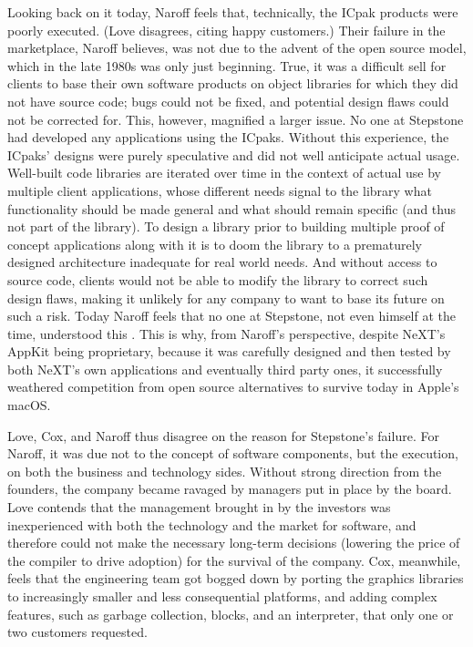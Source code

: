 \documentclass[acmsmall]{acmart}\settopmatter{}
\begin{document}
Looking back on it today, Naroff feels that, technically, the ICpak products were poorly executed. (Love disagrees, citing happy customers.) Their failure in the marketplace, Naroff believes, was not due to the advent of the open source model, which in the late 1980s was only just beginning. True, it was a difficult sell for clients to base their own software products on object libraries for which they did not have source code; bugs could not be fixed, and potential design flaws could not be corrected for. This, however, magnified a larger issue. No one at Stepstone had developed any applications using the ICpaks. Without this experience, the ICpaks' designs were purely speculative and did not well anticipate actual usage. Well-built code libraries are iterated over time in the context of actual use by multiple client applications, whose different needs signal to the library what functionality should be made general and what should remain specific (and thus not part of the library). To design a library prior to building multiple proof of concept applications along with it is to doom the library to a prematurely designed architecture inadequate for real world needs. And without access to source code, clients would not be able to modify the library to correct such design flaws, making it unlikely for any company to want to base its future on such a risk. Today Naroff feels that no one at Stepstone, not even himself at the time, understood this \citep[24--25]{naroff_oral_2018}. This is why, from Naroff's perspective, despite NeXT's AppKit being proprietary, because it was carefully designed and then tested by both NeXT's own applications and eventually third party ones, it successfully weathered competition from open source alternatives to survive today in Apple's macOS. 

Love, Cox, and Naroff thus disagree on the reason for Stepstone's failure. For Naroff, it was due not to the concept of software components, but the execution, on both the business and technology sides. Without strong direction from the founders, the company became ravaged by managers put in place by the board. Love contends that the management brought in by the investors was inexperienced with both the technology and the market for software, and therefore could not make the necessary long-term decisions (lowering the price of the compiler to drive adoption) for the survival of the company. Cox, meanwhile, feels that the engineering team got bogged down by porting the graphics libraries to increasingly smaller and less consequential platforms, and adding complex features, such as garbage collection, blocks, and an interpreter, that only one or two customers requested. 
\end{document}
